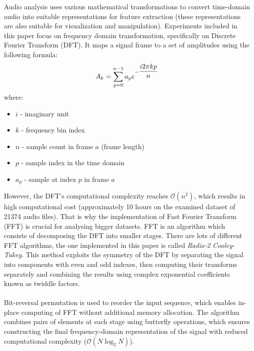 \documentclass[
onecolumn,
]{ceurart}
\begin{document}
Audio analysis uses various mathematical transformations to convert time-domain audio into suitable representations for feature extraction (these representations are also suitable for visualization and manipulation)\cite{yustisar2020discrete,tzanetakis2001audio}. Experiments included in this paper focus on frequency domain transformation, specifically on Discrete Fourier Transform (DFT). It maps a signal frame to a set of amplitudes using the following formula:
\vspace{-8pt}
\[
	A_k=\sum\limits_{p=0}^{n-1}a_pe^{-\dfrac{i2\pi kp}{n}}
  \vspace{-10pt}
\]
\vspace{-4pt}
where:
\vspace{-3pt}
\begin{itemize}
  \item $i$ - imaginary unit
  \item $k$ - frequency bin index
  \item $n$ - sample count in frame $a$ (frame length)
  \item $p$ - sample index in the time domain
  \item $a_p$ - sample at index $p$ in frame $a$
\end{itemize}
\vspace{-4pt}
However, the DFT's computational complexity reaches $\mathcal{O}(n^2)$, which results in high computational cost (approximately 10 hours on the examined dataset of 21374 audio files). That is why the implementation of Fast Fourier Transform (FFT) is crucial for analysing bigger datasets.
FFT is an algorithm which consists of decomposing the DFT into smaller stages. There are lots of different FFT algorithms\cite{heckbert1995fourier,soni2011general}, the one implemented in this paper is called \textit{Radix-2 Cooley-Tukey}. This method exploits the symmetry of the DFT by separating the signal into components with even and odd indexes, then computing their transforms separately and combining the results using complex exponential coefficients known as twiddle factors\cite{coelho2024discrete}.
\\\ \\
Bit-reversal permutation is used to reorder the input sequence, which enables in-place computing of FFT without additional memory allocation. The algorithm combines pairs of elements at each stage using butterfly operations, which ensures constructing the final frequency-domain  representation of the signal with reduced computational complexity ($\mathcal{O}(N\log_2N)$).
\\\ \\
\end{document}
